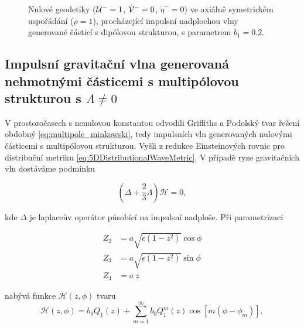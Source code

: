 \begin{figure}[ht]
    \centering
    \caption{Nulové geodetiky ($\dot {\mathcal{U}}^-=1$, $\dot {\mathcal{V}}^-=0$, $\dot \eta^-=0$) ve axiálně symetrickém uspořádání ($\rho=1$), procházející impulsní nadplochou vlny generované částicí s dipólovou strukturou,
    s parametrem $b_1=0.2$.}
    \label{fig:DipoleAxial}
\end{figure}
\clearpage

\subsection{Impulsní gravitační vlna generovaná nehmotnými částicemi s multipólovou strukturou s $\Lambda\neq 0$}

V prostoročasech s nenulovou konstantou odvodili Griffiths a Podolský \cite{Podolsky1997} tvar řešení obdobný \eqref{eq:multipole_minkowski},
tedy impulsních vln generovaných nulovými částicemi s multipólovou strukturou. Vyšli z redukce Einsteinových rovnic pro distribuční
metriku \eqref{eq:5DDistributionalWaveMetric}. V případě ryze gravitačních vln dostáváme podmínku

\begin{equation}
    \label{eq:podminka_na_H_lambda_stare}
    \left(\Delta + \frac{2}{3} \Lambda \right)\mathcal{H} = 0,
\end{equation}

kde $\Delta$ je laplaceův operátor působící na impulsní nadploše. Při parametrizaci 

\begin{equation}
    \begin{split}
        Z_2 &= a \sqrt{\epsilon(1-z^2)} \cos \phi\\
        Z_3 &= a \sqrt{\epsilon(1-z^2)} \sin \phi\\
        Z_4 &= a~z
    \end{split}
\end{equation}

nabývá funkce $\mathcal{H}(z, \phi)$ tvaru
\begin{equation}
    \mathcal{H}(z, \phi) = b_0 Q_1(z) + \sum_{m=1}^\infty b_0 Q_1^m(z) \cos [m(\phi - \phi_m)],
\end{equation}

